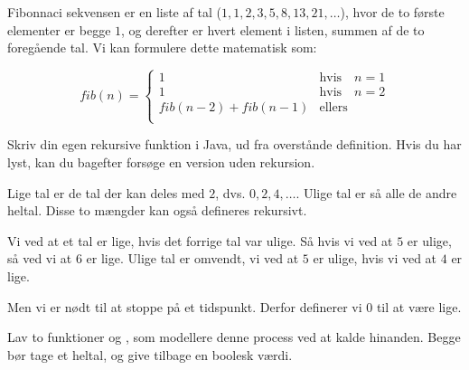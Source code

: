         \begin{exercise}
            Fibonnaci sekvensen er en liste af tal (\(1, 1, 2, 3, 5,
            8, 13, 21, \dots\)), hvor de to første elementer er
            begge \(1\), og derefter er hvert element i listen,
            summen af de to foregående tal. Vi kan formulere dette
            matematisk som:

            \begin{equation}
                fib(n) = \begin{cases}
                             1                   & \text{hvis} \quad n = 1 \\
                             1                   & \text{hvis} \quad n = 2 \\
                             fib(n-2)+fib(n-1)   & \text{ellers} \\
                      \end{cases}
            \end{equation}

            Skriv din egen rekursive  funktion i Java,
            ud fra overstånde definition. Hvis du har lyst, kan du
            bagefter forsøge en version uden rekursion.
        \end{exercise}


	\begin{exercise}
		Lige tal er de tal der kan deles med \(2\), dvs. \(0, 2, 4, \dots\).
		Ulige tal er så alle de andre heltal. Disse to mængder kan også defineres
		rekursivt.

		Vi ved at et tal er lige, hvis det forrige tal var ulige. Så hvis vi ved
		at \(5\) er ulige, så ved vi at \(6\) er lige. Ulige tal er omvendt, vi
		ved at \(5\) er ulige, hvis vi ved at \(4\) er lige.

		Men vi er nødt til at stoppe på et tidspunkt. Derfor definerer vi
		\(0\) til at være lige.

		Lav to funktioner  og , som modellere
		denne process ved at kalde hinanden. Begge bør tage et heltal, og give
		tilbage en boolesk værdi.


	\end{exercise}

